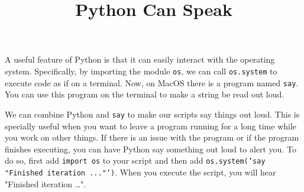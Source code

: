 \documentclass[12pt, a4paper]{article}
\date{}
\title{Python Can Speak}
\begin{document}
\maketitle
A useful feature of Python is that it can easily interact with the operating system. Specifically, by importing the module \texttt{os}, we can call \texttt{os.system} to execute code as if on a terminal.
Now, on MacOS there is a program named \texttt{say}. You can use this program on the terminal to make a string be read out loud.

We can combine Python and \texttt{say} to make our scripts say things out loud. This is specially useful when you want to leave a program running for a long time while you work on other things. If there is an issue with the program or if the program finishes executing, you can have Python say something out loud to alert you.
To do so, first add \texttt{import os} to your script and then add \texttt{os.system('say "Finished iteration ..."')}. When you execute the script, you will hear "Finished iteration \ldots{}".
\end{document}
